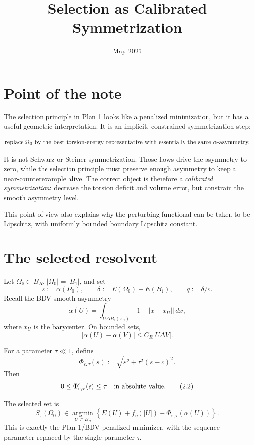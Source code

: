 \documentclass[11pt]{article}
\title{Selection as Calibrated Symmetrization}
\author{}
\date{May 2026}
\newcommand{\abs}[1]{\left|#1\right|}
\begin{document}
\maketitle

\section{Point of the note}

The selection principle in Plan 1 looks like a penalized minimization, but it
has a useful geometric interpretation.  It is an implicit, constrained
symmetrization step:

\[
   \hbox{replace } \Omega_0
   \hbox{ by the best torsion-energy representative with essentially the same }
   \alpha\hbox{-asymmetry.}
\]

It is not Schwarz or Steiner symmetrization.  Those flows drive the asymmetry
to zero, while the selection principle must preserve enough asymmetry to keep
a near-counterexample alive.  The correct object is therefore a
\emph{calibrated symmetrization}: decrease the torsion deficit and volume
error, but constrain the smooth asymmetry level.

This point of view also explains why the perturbing functional can be taken to
be Lipschitz, with uniformly bounded boundary Lipschitz constant.

\section{The selected resolvent}

Let \(\Omega_0\subset B_R\), \(\abs{\Omega_0}=\abs{B_1}\), and set
\[
   \varepsilon:=\alpha(\Omega_0),
   \qquad
   \delta:=E(\Omega_0)-E(B_1),
   \qquad
   q:=\delta/\varepsilon.
\]
Recall the BDV smooth asymmetry
\[
   \alpha(U)
      =
      \int_{U\Delta B_1(x_U)}
        \bigl|1-\abs{x-x_U}\bigr|\,dx,
\]
where \(x_U\) is the barycenter.  On bounded sets,
\[
   \abs{\alpha(U)-\alpha(V)}
      \le C_R\abs{U\Delta V}.
   \tag{2.1}\label{eq:alpha-l1-lip}
\]

For a parameter \(\tau\ll1\), define
\[
   \Phi_{\varepsilon,\tau}(s)
      :=
      \sqrt{\varepsilon^2+\tau^2(s-\varepsilon)^2}.
\]
Then
\[
   0\le \Phi_{\varepsilon,\tau}'(s)\le \tau
   \quad\hbox{in absolute value.}
   \tag{2.2}\label{eq:phi-slope}
\]

The selected set is
\[
   S_{\tau}(\Omega_0)
      \in
      \operatorname*{argmin}_{U\subset B_R}
      \left\{
      E(U)+f_{\hat\eta}(\abs U)
      +\Phi_{\varepsilon,\tau}(\alpha(U))
      \right\}.
   \tag{2.3}
\]
This is exactly the Plan 1/BDV penalized minimizer, with the sequence parameter
replaced by the single parameter \(\tau\).
\end{document}
